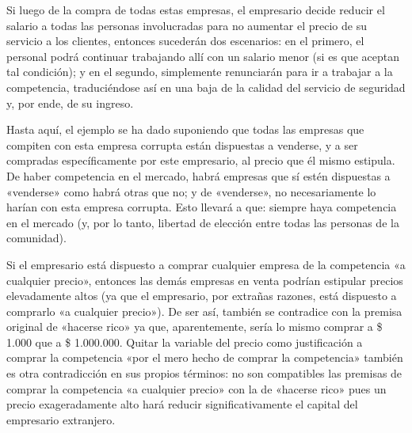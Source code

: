 \documentclass[12pt,a4paper,twoside]{book}
\begin{document}
Si luego de la compra de todas estas empresas, el empresario decide reducir el salario a todas las personas involucradas para no aumentar el precio de su servicio a los clientes, entonces sucederán dos escenarios: en el primero, el personal podrá continuar trabajando allí con un salario menor (si es que aceptan tal condición); y en el segundo, simplemente renunciarán para ir a trabajar a la competencia, traduciéndose así en una baja de la calidad del servicio de seguridad y, por ende, de su ingreso.

Hasta aquí, el ejemplo se ha dado suponiendo que todas las empresas que compiten con esta empresa corrupta están dispuestas a venderse, y a ser compradas específicamente por este empresario, al precio que él mismo estipula. De haber competencia en el mercado, habrá empresas que sí estén dispuestas a «venderse» como habrá otras que no; y de «venderse», no necesariamente lo harían con esta empresa corrupta. Esto llevará a que: siempre haya competencia en el mercado (y, por lo tanto, libertad de elección entre todas las personas de la comunidad).

Si el empresario está dispuesto a comprar cualquier empresa de la competencia «a cualquier precio», entonces las demás empresas en venta podrían estipular precios elevadamente altos (ya que el empresario, por extrañas razones, está dispuesto a comprarlo «a cualquier precio»). De ser así, también se contradice con la premisa original de «hacerse rico» ya que, aparentemente, sería lo mismo comprar a \$ 1.000 que a \$ 1.000.000. Quitar la variable del precio como justificación a comprar la competencia «por el mero hecho de comprar la competencia» también es otra contradicción en sus propios términos: no son compatibles las premisas de comprar la competencia «a cualquier precio» con la de «hacerse rico» pues un precio exageradamente alto hará reducir significativamente el capital del empresario extranjero.
\end{document}
